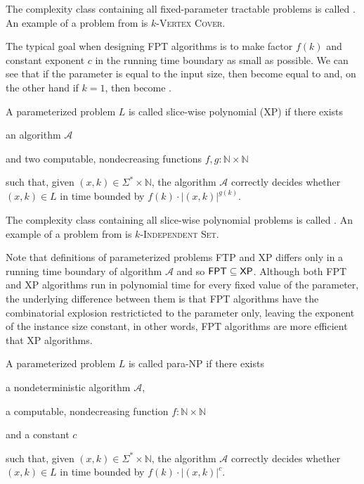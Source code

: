 The complexity class containing all fixed-parameter tractable problems is called \FPT.
An example of a problem from \FPT is $k$-\textsc{Vertex Cover}. 

The typical goal when designing FPT algorithms is to make factor $f(k)$ and constant exponent $c$
in the running time boundary as small as possible.
We can see that if the parameter is equal to the input size, then \FPT become equal to \NP and,
on the other hand if $k = 1$, then \FPT become \Po \cite{Koutensky2020}.

\begin{definition}[XP]
    A parameterized problem $L$ is called slice-wise polynomial (XP) if there exists
    \begin{description}
        \item an algorithm $\mathcal{A}$
        \item and two computable, nondecreasing functions $f,g : \mathbb{N} \times \mathbb{N}$
    \end{description}
    such that, given $(x,k) \in \Sigma^* \times \mathbb{N}$,
    the algorithm $\mathcal{A}$ correctly decides whether $(x, k) \in L$ in time bounded by
    $f(k) \cdot |(x,k)|^{g(k)}$.
\end{definition}

The complexity class containing all slice-wise polynomial problems is called \XP.
An example of a problem from \XP is $k$-\textsc{Independent Set}.

Note that definitions of parameterized problems FTP and XP differs only in a running time boundary of algorithm $\mathcal{A}$
and so $\textsf{FPT} \subseteq \textsf{XP}$.
Although both FPT and XP algorithms run in polynomial time for every fixed value of the parameter,
the underlying difference between them is that FPT algorithms have the combinatorial explosion
restricticted to the parameter only, leaving the exponent of the instance size constant, in other words,
FPT algorithms are more efficient that XP algorithms.

\begin{definition}[para-NP]
    A parameterized problem $L$ is called para-NP if there exists
    \begin{description}
        \item a nondeterministic algorithm $\mathcal{A}$,
        \item a computable, nondecreasing function $f : \mathbb{N} \times \mathbb{N}$
        \item and a constant $c$
    \end{description}
    such that, given $(x,k) \in \Sigma^* \times \mathbb{N}$,
    the algorithm $\mathcal{A}$ correctly decides whether $(x, k) \in L$ in time bounded by
    $f(k) \cdot |(x,k)|^c$.
\end{definition}

